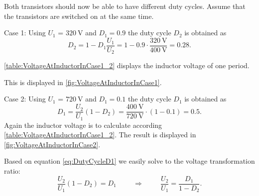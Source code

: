 \vspace{2em}\par
Both transistors should now be able to have different duty cycles. Assume that the transistors are switched on at the same time.


\begin{solutionblock}
    Case 1: Using $U_\mathrm{1}$ = $\SI{320}{\volt}$ and $D_1 = 0.9$ the duty cycle $D_2$ is obtained as
    \begin{equation}
        D_2 = 1 - D_1 \frac{U_\mathrm{1}}{U_\mathrm{2}} = 1 - 0.9 \cdot \frac{\SI{320}{\volt}}{\SI{400}{\volt}}= 0.28.
    \end{equation}

    \autoref{table:VoltageAtInductorInCase1_2} displays the inductor voltage of one period.
    
    This is displayed in \autoref{fig:VoltageAtInductorInCase1}.
    

    
    Case 2: Using $U_\mathrm{1}$ = $\SI{720}{\volt}$ and $D_1 = 0.1$ the duty cycle $D_1$ is obtained as
    \begin{equation}
        D_1 = \frac{U_\mathrm{2}}{U_\mathrm{1}} \left(1 - D_2 \right)= \frac{\SI{400}{\volt}}{\SI{720}{\volt}} \cdot \left(1 - 0.1\right) = 0.5.
        \label{eq:DutyCycleD1}
    \end{equation}
    Again the inductor voltage is to calculate according \autoref{table:VoltageAtInductorInCase1_2}.
    The result is displayed in \autoref{fig:VoltageAtInductorInCase2}.

    
        
\end{solutionblock}

\begin{solutionblock}
    Based on equation \eqref{eq:DutyCycleD1} we easily solve to the voltage transformation ratio:
    \begin{equation}
        \frac{U_\mathrm{2}}{U_\mathrm{1}} \left(1 - D_2 \right) = D_1 
        \hspace{1cm} \Rightarrow \hspace{1cm}
        \frac{U_\mathrm{2}}{U_\mathrm{1}} = \frac{D_1} {1-D_2}.
    \end{equation}
\end{solutionblock}


